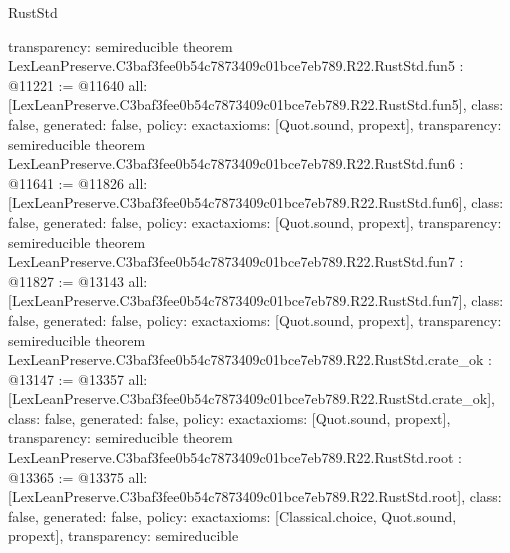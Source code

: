 \begin{lexlean}{RustStd}
\begin{coremodule}
{  transparency: semireducible
}
theorem LexLeanPreserve.C3baf3fee0b54c7873409c01bce7eb789.R22.RustStd.fun5 : @11221 := @11640 {
  all: [LexLeanPreserve.C3baf3fee0b54c7873409c01bce7eb789.R22.RustStd.fun5],
  class: false,
  generated: false,
  policy: exact{axioms: [Quot.sound, propext]},
  transparency: semireducible
}
theorem LexLeanPreserve.C3baf3fee0b54c7873409c01bce7eb789.R22.RustStd.fun6 : @11641 := @11826 {
  all: [LexLeanPreserve.C3baf3fee0b54c7873409c01bce7eb789.R22.RustStd.fun6],
  class: false,
  generated: false,
  policy: exact{axioms: [Quot.sound, propext]},
  transparency: semireducible
}
theorem LexLeanPreserve.C3baf3fee0b54c7873409c01bce7eb789.R22.RustStd.fun7 : @11827 := @13143 {
  all: [LexLeanPreserve.C3baf3fee0b54c7873409c01bce7eb789.R22.RustStd.fun7],
  class: false,
  generated: false,
  policy: exact{axioms: [Quot.sound, propext]},
  transparency: semireducible
}
theorem LexLeanPreserve.C3baf3fee0b54c7873409c01bce7eb789.R22.RustStd.crate_ok : @13147 := @13357 {
  all: [LexLeanPreserve.C3baf3fee0b54c7873409c01bce7eb789.R22.RustStd.crate_ok],
  class: false,
  generated: false,
  policy: exact{axioms: [Quot.sound, propext]},
  transparency: semireducible
}
theorem LexLeanPreserve.C3baf3fee0b54c7873409c01bce7eb789.R22.RustStd.root : @13365 := @13375 {
  all: [LexLeanPreserve.C3baf3fee0b54c7873409c01bce7eb789.R22.RustStd.root],
  class: false,
  generated: false,
  policy: exact{axioms: [Classical.choice, Quot.sound, propext]},
  transparency: semireducible
}


\end{coremodule}
\end{lexlean}
